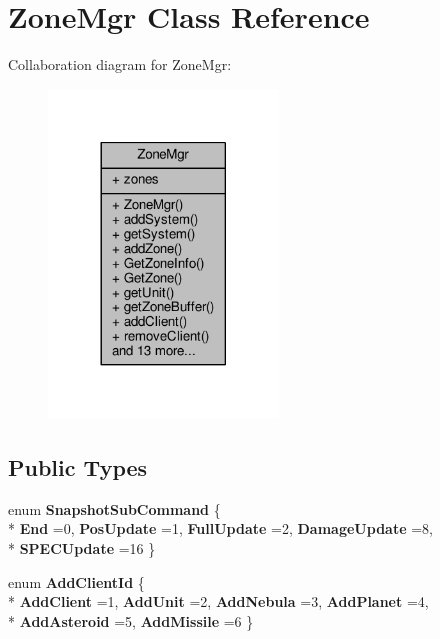 \hypertarget{classZoneMgr}{}\section{Zone\+Mgr Class Reference}
\label{classZoneMgr}


Collaboration diagram for Zone\+Mgr\+:
\nopagebreak
\begin{figure}[H]
\begin{center}
\leavevmode
\includegraphics[width=173pt]{d8/dac/classZoneMgr__coll__graph}
\end{center}
\end{figure}
\subsection*{Public Types}
\begin{DoxyCompactItemize}
\item 
enum {\bfseries Snapshot\+Sub\+Command} \{ \\*
{\bfseries End} =0, 
{\bfseries Pos\+Update} =1, 
{\bfseries Full\+Update} =2, 
{\bfseries Damage\+Update} =8, 
\\*
{\bfseries S\+P\+E\+C\+Update} =16
 \}\hypertarget{classZoneMgr_a431e70600201aeb0409c4c4ee9d0a82b}{}\label{classZoneMgr_a431e70600201aeb0409c4c4ee9d0a82b}

\item 
enum {\bfseries Add\+Client\+Id} \{ \\*
{\bfseries Add\+Client} =1, 
{\bfseries Add\+Unit} =2, 
{\bfseries Add\+Nebula} =3, 
{\bfseries Add\+Planet} =4, 
\\*
{\bfseries Add\+Asteroid} =5, 
{\bfseries Add\+Missile} =6
 \}\hypertarget{classZoneMgr_ac899ecb9860c6545af19b334e85c2e7d}{}\label{classZoneMgr_ac899ecb9860c6545af19b334e85c2e7d}

\end{DoxyCompactItemize}
